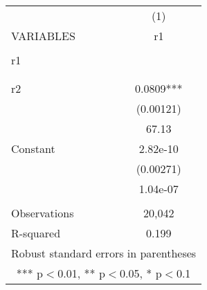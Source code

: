 \begin{tabular}{lc} \hline
 & (1) \\
VARIABLES & r1 \\ \hline
 &  \\
r1 &  \\
 &  \\
 &  \\
r2 & 0.0809*** \\
 & (0.00121) \\
 & 67.13 \\
Constant & 2.82e-10 \\
 & (0.00271) \\
 & 1.04e-07 \\
 &  \\
Observations & 20,042 \\
 R-squared & 0.199 \\ \hline
\multicolumn{2}{c}{ Robust standard errors in parentheses} \\
\multicolumn{2}{c}{ *** p$<$0.01, ** p$<$0.05, * p$<$0.1} \\
\end{tabular}
